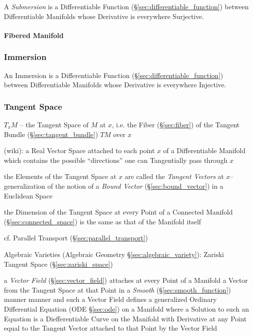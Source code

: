 A \emph{Submersion} is a Differentiable Function
(\S\ref{sec:differentiable_function}) between Differentiable Manifolds
whose Derivative is everywhere Surjective.



\paragraph{Fibered Manifold}\label{sec:fibered_manifold}\hfill



\subsubsection{Immersion}\label{sec:immersion}

An Immersion is a Differentiable Function
(\S\ref{sec:differentiable_function}) between Differentiable Manifolds
whose Derivative is everywhere Injective.



\subsubsection{Tangent Space}\label{sec:tangent_space}

$T_x M$ -- the Tangent Space of $M$ at $x$, i.e. the Fiber (\S\ref{sec:fiber})
of the Tangent Bundle (\S\ref{sec:tangent_bundle}) $T M$ over $x$

(wiki): a Real Vector Space attached to each point $x$ of a Differentiable
Manifold which contains the possible ``directions'' one can Tangentially pass
through $x$

the Elements of the Tangent Space at $x$ are called the \emph{Tangent Vectors}
at $x$-- generalization of the notion of a \emph{Bound Vector}
(\S\ref{sec:bound_vector}) in a Euclidean Space

the Dimension of the Tangent Space at every Point of a Connected Manifold
(\S\ref{sec:connected_space}) is the same as that of the Manifold itself

\fist cf. Parallel Transport (\S\ref{sec:parallel_transport})

\fist Algebraic Varieties (Algebraic Geometry \S\ref{sec:algebraic_variety}):
Zariski Tangent Space (\S\ref{sec:zariski_space})

a \emph{Vector Field} (\S\ref{sec:vector_field}) attaches at every Point of a
Manifold a Vector from the Tangent Space at that Point in a \emph{Smooth}
(\S\ref{sec:smooth_function}) manner manner and such a Vector Field defines a
generalized Ordinary Differential Equation (ODE \S\ref{sec:ode}) on a Manifold
where a Solution to such an Equation is a Diefferentiable Curve on the Manifold
with Derivative at any Point equal to the Tangent Vector attached to that Point
by the Vector Field

